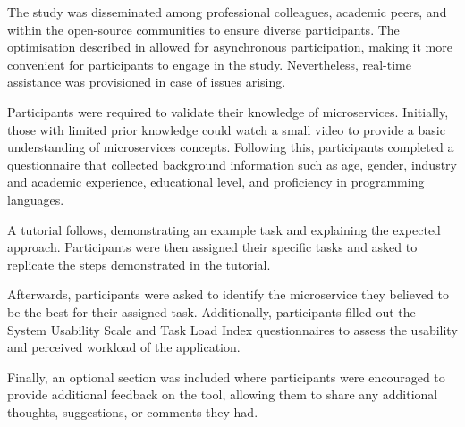 The study was disseminated among professional colleagues, academic peers, and
within the open-source communities to ensure diverse participants. The
optimisation described in  allowed for asynchronous
participation, making it more convenient for participants to engage in the
study. Nevertheless, real-time assistance was provisioned in case of issues
arising.

Participants were required to validate their knowledge of microservices.
Initially, those with limited prior knowledge could watch a small video to
provide a basic understanding of microservices concepts. Following this,
participants completed a questionnaire that collected background information
such as age, gender, industry and academic experience, educational level, and
proficiency in programming languages.

A tutorial follows, demonstrating an example task and explaining the expected
approach. Participants were then assigned their specific tasks and asked to
replicate the steps demonstrated in the tutorial.

Afterwards, participants were asked to identify the microservice they believed
to be the best for their assigned task. Additionally, participants filled out
the System Usability Scale and Task Load Index questionnaires to assess the
usability and perceived workload of the application.

Finally, an optional section was included where participants were encouraged to
provide additional feedback on the tool, allowing them to share any additional
thoughts, suggestions, or comments they had.
